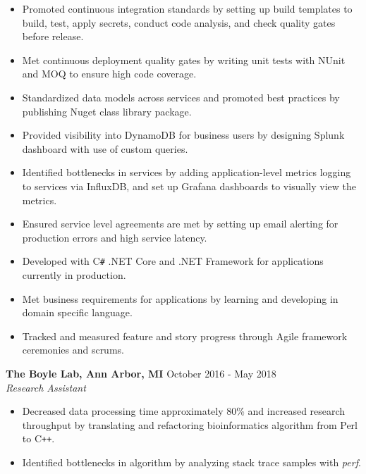 \documentclass[overlapped]{res}
\begin{document}
\begin{resume}
\begin{itemize}
    \item Promoted continuous integration standards by setting up build templates to build,
    test, apply secrets, conduct code analysis,
    and check quality gates before release.

    \item Met continuous deployment quality gates by writing unit tests
    with NUnit and MOQ to ensure high code coverage.

    \item Standardized data models across services
    and promoted best practices
    by publishing Nuget class library package.

    \item Provided visibility into DynamoDB for business users
    by designing Splunk dashboard with use of
    custom queries.

    \item Identified bottlenecks in services by adding application-level
    metrics logging to services via InfluxDB,
    and set up Grafana dashboards to visually view the metrics.

    \item Ensured service level agreements are met by setting up email alerting 
    for production errors and high service latency.

    \item Developed with C\texttt{\#} .NET Core and .NET Framework
    for applications currently in production.

    \item Met business requirements for applications by learning
    and developing in domain specific language.

    \item Tracked and measured feature and story progress through
    Agile framework ceremonies and scrums.

\end{itemize}

\textbf{The Boyle Lab, Ann Arbor, MI}
\hfill October 2016 - May 2018 \\
{\sl Research Assistant}
    \begin{itemize}  \itemsep -2pt %
    \item Decreased data processing time approximately 80\% 
    and increased research throughput
    by translating and refactoring bioinformatics algorithm 
    from Perl to C\texttt{++}.
    
    \item Identified bottlenecks in algorithm by analyzing stack trace samples with \textit{perf}.
    

\end{itemize}
\end{resume}
\end{document}

